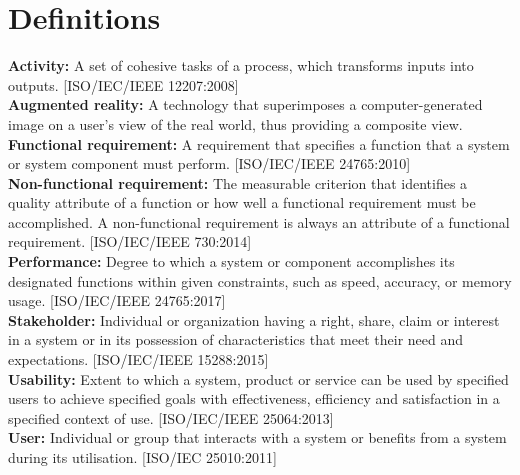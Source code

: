 \section{Definitions}
\textbf{Activity:} A set of cohesive tasks of a process, which transforms inputs into outputs. [ISO/IEC/IEEE 12207:2008]\\
\newline
\textbf{Augmented reality:} A technology that superimposes a computer-generated image on a user's view of the real world, thus providing a composite view. \\
\newline
\textbf{Functional requirement:} A requirement that specifies a function that a system or system component must perform. [ISO/IEC/IEEE 24765:2010]\\
\newline
\textbf{Non-functional requirement:} The measurable criterion that identifies a quality attribute of a function or how well a functional requirement must be accomplished. A non-functional requirement is always an attribute of a functional requirement. [ISO/IEC/IEEE 730:2014]\\
\newline
\textbf{Performance:} Degree to which a system or component accomplishes its designated functions within given constraints, such as speed, accuracy, or memory usage. [ISO/IEC/IEEE 24765:2017]\\
\newline
\textbf{Stakeholder:} Individual or organization having a right, share, claim or interest in a system or in its possession of characteristics that meet their need and expectations. [ISO/IEC/IEEE 15288:2015]\\
\newline
\textbf{Usability:} Extent to which a system, product or service can be used by specified users to achieve specified goals with effectiveness, efficiency and satisfaction in a specified context of use. [ISO/IEC/IEEE 25064:2013]\\
\newline
\textbf{User:} Individual or group that interacts with a system or benefits from a system during its utilisation. [ISO/IEC 25010:2011]